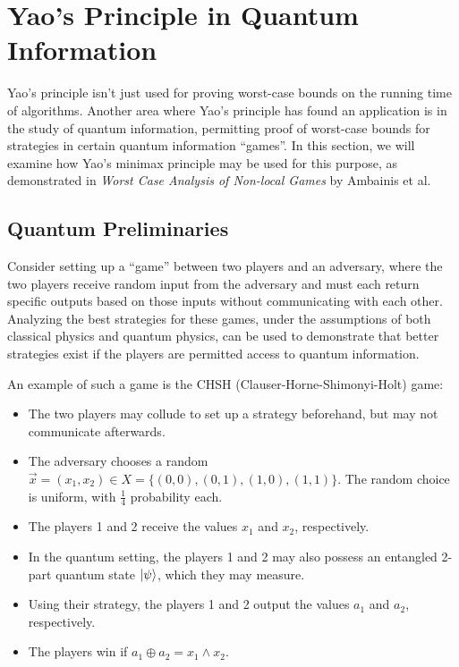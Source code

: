 \section{Yao's Principle in Quantum Information}

Yao's principle isn't just used for proving worst-case bounds on the running time of algorithms. Another area where Yao's principle has found an application is in the study of quantum information, permitting proof of worst-case bounds for strategies in certain quantum information ``games''. In this section, we will examine how Yao's minimax principle may be used for this purpose, as demonstrated in \emph{Worst Case Analysis of Non-local Games} by Ambainis et al.


\subsection{Quantum Preliminaries}

Consider setting up a ``game'' between two players and an adversary, where the two players receive random input from the adversary and must each return specific outputs based on those inputs without communicating with each other. Analyzing the best strategies for these games, under the assumptions of both classical physics and quantum physics, can be used to demonstrate that better strategies exist if the players are permitted access to quantum information.

An example of such a game is the CHSH (Clauser-Horne-Shimonyi-Holt) game:

\begin{itemize}
\item{The two players may collude to set up a strategy beforehand, but may not communicate afterwards.}
\item{The adversary chooses a random $\vec{x}=(x_1, x_2) \in X=\{(0,0), (0,1), (1,0), (1,1)\}$. The random choice is uniform, with $\frac14$ probability each.}
\item{The players 1 and 2 receive the values $x_1$ and $x_2$, respectively.}
\item{In the quantum setting, the players 1 and 2 may also possess an entangled 2-part quantum state $\ket{\psi}$, which they may measure.}
\item{Using their strategy, the players 1 and 2 output the values $a_1$ and $a_2$, respectively.}
\item{The players win if $a_1 \oplus a_2 = x_1 \wedge x_2$.}
\end{itemize}

